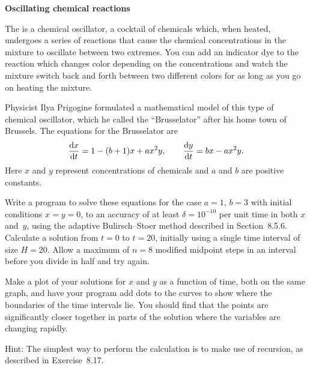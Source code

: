 \documentclass[12pt]{article}
\begin{document}
\begin{exercises}

\exercise \textbf{Oscillating chemical reactions}

\exskip The  is a chemical
oscillator, a cocktail of chemicals which, when heated, undergoes a series
of reactions that cause the chemical concentrations in the mixture to
oscillate between two extremes.  You can add an indicator dye to the
reaction which changes color depending on the concentrations and watch the
mixture switch back and forth between two different colors for as long as
you go on heating the mixture.

Physicist Ilya Prigogine formulated a mathematical model of this type of
chemical oscillator, which he called the ``Brusselator'' after his
home town of Brussels.  The equations for the Brusselator are
\begin{displaymath}
{\mathrm{d}x\over\mathrm{d}t} = 1 - (b+1)x + ax^2y, \qquad
{\mathrm{d}y\over\mathrm{d}t} = bx - ax^2y.
\end{displaymath}
Here $x$ and $y$ represent concentrations of chemicals and $a$ and $b$ are
positive constants.

Write a program to solve these equations for the case $a=1$, $b=3$ with
initial conditions $x=y=0$, to an accuracy of at least $\delta=10^{-10}$
per unit time in both $x$ and~$y$, using the adaptive Bulirsch--Stoer
method described in Section~8.5.6.  Calculate a solution from $t=0$ to
$t=20$, initially using a single time interval of size $H=20$.  Allow a
maximum of $n=8$ modified midpoint steps in an interval before you divide
in half and try again.

Make a plot of your solutions for $x$ and $y$ as a function of time, both
on the same graph, and have your program add dots to the curves to show
where the boundaries of the time intervals lie.  You should find that the
points are significantly closer together in parts of the solution where the
variables are changing rapidly.

Hint: The simplest way to perform the calculation is to make use of
recursion, as described in Exercise~8.17.

\end{exercises}
\end{document}
